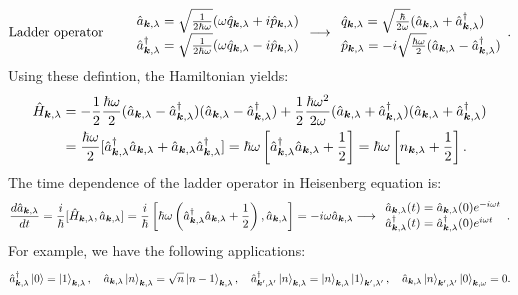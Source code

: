 \begin{align*}
    \text{Ladder operator}\qquad
    \begin{array}{l}
        \hat{a}_{\bm{k},\lambda}=\sqrt{\frac{1}{2\hbar\omega}}(\omega\hat{q}_{\bm{k},\lambda}+i\hat{p}_{\bm{k},\lambda})\\
        \hat{a}_{\bm{k},\lambda}^\dagger=\sqrt{\frac{1}{2\hbar\omega}}(\omega\hat{q}_{\bm{k},\lambda}-i\hat{p}_{\bm{k},\lambda})
    \end{array}\longrightarrow
    \begin{array}{l}
        \hat{q}_{\bm{k},\lambda}=\sqrt{\frac{\hbar}{2\omega}}(\hat{a}_{\bm{k},\lambda}+\hat{a}_{\bm{k},\lambda}^\dagger)\\
        \hat{p}_{\bm{k},\lambda}=-i\sqrt{\frac{\hbar\omega}{2}}(\hat{a}_{\bm{k},\lambda}-\hat{a}_{\bm{k},\lambda}^\dagger)
    \end{array}.
\end{align*}
Using these defintion, the Hamiltonian yields:
\begin{align*}
    \hat{H}_{\bm{k},\lambda}&=-\frac{1}{2}\frac{\hbar\omega}{2}(\hat{a}_{\bm{k},\lambda}-\hat{a}_{\bm{k},\lambda}^\dagger)(\hat{a}_{\bm{k},\lambda}-\hat{a}_{\bm{k},\lambda}^\dagger)+\frac{1}{2}\frac{\hbar\omega^2}{2\omega}(\hat{a}_{\bm{k},\lambda}+\hat{a}_{\bm{k},\lambda}^\dagger)(\hat{a}_{\bm{k},\lambda}+\hat{a}_{\bm{k},\lambda}^\dagger)\\
    &=\frac{\hbar\omega}{2}[\hat{a}_{\bm{k},\lambda}^\dagger\hat{a}_{\bm{k},\lambda}+\hat{a}_{\bm{k},\lambda}\hat{a}_{\bm{k},\lambda}^\dagger]=\hbar\omega\left[\hat{a}_{\bm{k},\lambda}^\dagger\hat{a}_{\bm{k},\lambda}+\frac{1}{2}\right]=\hbar\omega\left[n_{\bm{k},\lambda}+\frac{1}{2}\right].
\end{align*}
The time dependence of the ladder operator in Heisenberg equation is:
\begin{align*}
    \frac{d\hat{a}_{\bm{k},\lambda}}{dt}=\frac{i}{\hbar}[\hat{H}_{\bm{k},\lambda},\hat{a}_{\bm{k},\lambda}]=\frac{i}{\hbar}\left[\hbar\omega\left(\hat{a}_{\bm{k},\lambda}^\dagger
    \hat{a}_{\bm{k},\lambda}+\frac{1}{2}\right),\hat{a}_{\bm{k},\lambda}\right]=-i\omega\hat{a}_{\bm{k},\lambda}\longrightarrow
    \begin{array}{l}
        \hat{a}_{\bm{k},\lambda}(t)=\hat{a}_{\bm{k},\lambda}(0)e^{-i\omega t}\\
        \hat{a}_{\bm{k},\lambda}^\dagger(t)=\hat{a}_{\bm{k},\lambda}^\dagger(0)e^{i\omega t}
    \end{array}.
\end{align*}
For example, we have the following applications:
\begin{align*}
    \hat{a}^\dagger_{\bm{k},\lambda}\left|0\right\rangle=\left|1\right\rangle_{\bm{k},\lambda},\quad\hat{a}_{\bm{k},\lambda}\left|n\right\rangle_{\bm{k},\lambda}=\sqrt{n}\left|n-1\right\rangle_{\bm{k},\lambda},
    \quad\hat{a}^\dagger_{\bm{k}',\lambda'}\left|n\right\rangle_{\bm{k},\lambda}=\left|n\right\rangle_{\bm{k},\lambda}\left|1\right\rangle_{\bm{k}',\lambda'},\quad\hat{a}_{\bm{k},\lambda}\left|n\right\rangle_{\bm{k}',\lambda'}\left|0\right\rangle_{\bm{k},\omega}=0.
\end{align*}

